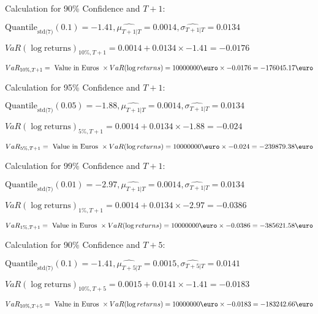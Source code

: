 Calculation for 90\% Confidence and $T+1$:

\indent\indent $\text{Quantile}_\text{std(7)}(0.1) = -1.41,\hat{\mu_{T+1|T}} = 0.0014, \hat{\sigma_{T+1|T}} = 0.0134$

\indent\indent $VaR(\log \text{returns})_{10\%, T + 1} = 0.0014 + 0.0134\times-1.41 = -0.0176$

\indent\indent $VaR_{10\%, T + 1} = \text{ Value in Euros } \times VaR(\log returns) = 10 000 000 \text{\euro} \times-0.0176 = -176045.17 \text{\euro}$\newline




Calculation for 95\% Confidence and $T+1$:

\indent\indent $\text{Quantile}_\text{std(7)}(0.05) = -1.88,\hat{\mu_{T+1|T}} = 0.0014, \hat{\sigma_{T+1|T}} = 0.0134$

\indent\indent $VaR(\log \text{returns})_{5\%, T + 1} = 0.0014 + 0.0134\times-1.88 = -0.024$

\indent\indent $VaR_{5\%, T + 1} = \text{ Value in Euros } \times VaR(\log returns) = 10 000 000 \text{\euro} \times-0.024 = -239879.38 \text{\euro}$\newline




Calculation for 99\% Confidence and $T+1$:

\indent\indent $\text{Quantile}_\text{std(7)}(0.01) = -2.97,\hat{\mu_{T+1|T}} = 0.0014, \hat{\sigma_{T+1|T}} = 0.0134$

\indent\indent $VaR(\log \text{returns})_{1\%, T + 1} = 0.0014 + 0.0134\times-2.97 = -0.0386$

\indent\indent $VaR_{1\%, T + 1} = \text{ Value in Euros } \times VaR(\log returns) = 10 000 000 \text{\euro} \times-0.0386 = -385621.58 \text{\euro}$\newline




Calculation for 90\% Confidence and $T+5$:

\indent\indent $\text{Quantile}_\text{std(7)}(0.1) = -1.41,\hat{\mu_{T+5|T}} = 0.0015, \hat{\sigma_{T+5|T}} = 0.0141$

\indent\indent $VaR(\log \text{returns})_{10\%, T + 5} = 0.0015 + 0.0141\times-1.41 = -0.0183$

\indent\indent $VaR_{10\%, T + 5} = \text{ Value in Euros } \times VaR(\log returns) = 10 000 000 \text{\euro} \times-0.0183 = -183242.66 \text{\euro}$\newline




